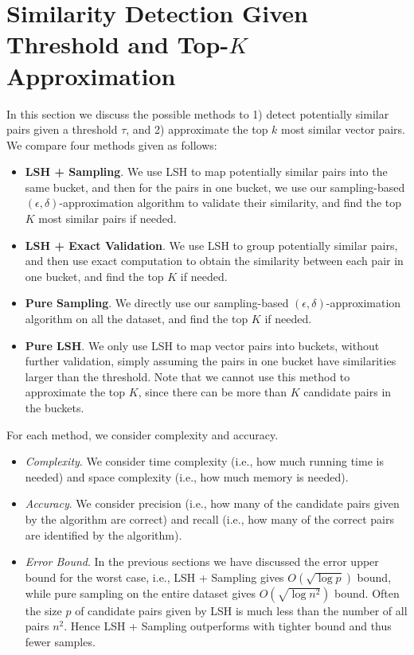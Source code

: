 \documentclass{article}
\begin{document}
\section{Similarity Detection Given Threshold and Top-$K$ Approximation}
\label{sec:cmp}
In this section we discuss the possible methods to 1) detect potentially similar pairs given a threshold $\tau$, and 2) approximate the top $k$ most similar vector pairs. We compare four methods given as follows:
\begin{itemize}
\item {\bf LSH + Sampling}. We use LSH to map potentially similar pairs into the same bucket, and then for the pairs in one bucket, we use our sampling-based $(\epsilon, \delta)$-approximation algorithm to validate their similarity, and find the top $K$ most similar pairs if needed.
\item {\bf LSH + Exact Validation}. We use LSH to group potentially similar pairs, and then use exact computation to obtain the similarity between each pair in one bucket, and find the top $K$ if needed.
\item {\bf Pure Sampling}. We directly use our sampling-based $(\epsilon, \delta)$-approximation algorithm on all the dataset, and find the top $K$ if needed.
\item {\bf Pure LSH}. We only use LSH to map vector pairs into buckets, without further validation, simply assuming the pairs in one bucket have similarities larger than the threshold. Note that we cannot use this method to approximate the top $K$, since there can be more than $K$ candidate pairs in the buckets.
\end{itemize}
For each method, we consider complexity and accuracy.
\begin{itemize}
\item \emph{Complexity}. We consider time complexity (i.e., how much running time is needed) and space complexity (i.e., how much memory is needed).
\item \emph{Accuracy}. We consider precision (i.e., how many of the candidate pairs given by the algorithm are correct) and recall (i.e., how many of the correct pairs are identified by the algorithm). 
\item \emph{Error Bound}. In the previous sections we have discussed the error upper bound for the worst case, i.e., LSH + Sampling gives $O(\sqrt{\log p})$ bound, while pure sampling on the entire dataset gives $O(\sqrt{\log n^2})$ bound. Often the size $p$ of candidate pairs given by LSH is much less than the number of all pairs $n^2$. Hence LSH + Sampling outperforms with tighter bound and thus fewer samples.
\end{itemize}
\end{document}
